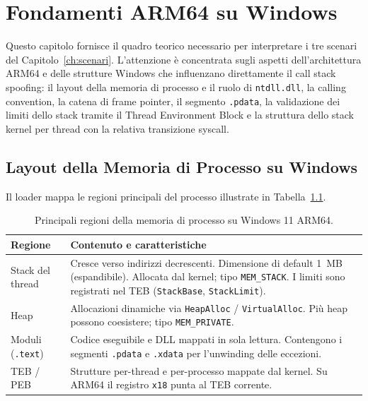 \chapter{Fondamenti ARM64 su Windows}
\label{ch:intro}

Questo capitolo fornisce il quadro teorico necessario per interpretare i tre
scenari del Capitolo~\ref{ch:scenari}. L'attenzione è concentrata sugli aspetti
dell'architettura ARM64 e delle strutture Windows che influenzano direttamente
il call stack spoofing: il layout della memoria di processo e il ruolo di
\texttt{ntdll.dll}, la calling convention, la catena di frame pointer, il
segmento \texttt{.pdata}, la validazione dei limiti dello stack tramite il
Thread Environment Block e la struttura dello stack kernel per thread con la
relativa transizione syscall.


\section{Layout della Memoria di Processo su Windows}

Il loader mappa le regioni principali del processo illustrate in
Tabella~\ref{tab:mem-layout}.

\begin{table}[H]
\centering
\begin{tabular}{lp{9cm}}
\toprule
Regione & Contenuto e caratteristiche \\
\midrule
Stack del thread   & Cresce verso indirizzi decrescenti. Dimensione di default 1~MB
                     (espandibile). Allocata dal kernel; tipo \texttt{MEM\_STACK}.
                     I limiti sono registrati nel TEB (\texttt{StackBase},
                     \texttt{StackLimit}). \\
Heap               & Allocazioni dinamiche via \texttt{HeapAlloc} /
                     \texttt{VirtualAlloc}. Più heap possono coesistere; tipo
                     \texttt{MEM\_PRIVATE}. \\
Moduli (\texttt{.text})   & Codice eseguibile e DLL mappati in sola lettura.
                     Contengono i segmenti \texttt{.pdata} e \texttt{.xdata}
                     per l'unwinding delle eccezioni. \\
TEB / PEB          & Strutture per-thread e per-processo mappate dal kernel.
                     Su ARM64 il registro \texttt{x18} punta al TEB corrente. \\
\bottomrule
\end{tabular}
\caption{Principali regioni della memoria di processo su Windows 11 ARM64.}
\label{tab:mem-layout}
\end{table}

